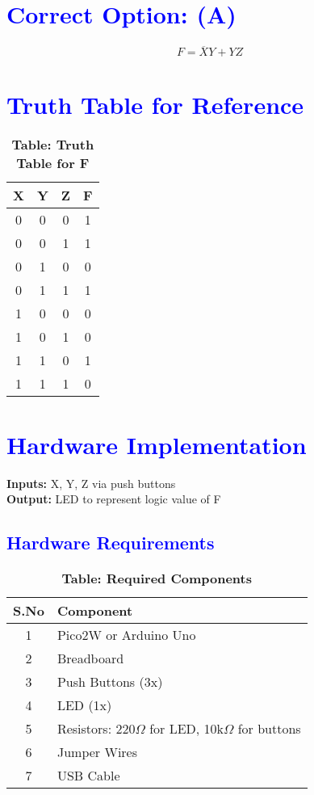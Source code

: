 \documentclass[twocolumn]{article}
\begin{document}
\section*{\textcolor{blue}{Correct Option: (A)}}
\[
F = \overline{X}Y + YZ
\]

\section*{\textcolor{blue}{Truth Table for Reference}}

\begin{table}[h]
\centering
\renewcommand{\arraystretch}{1.3}
\begin{tabular}{|c|c|c|c|}
\hline
\textbf{X} & \textbf{Y} & \textbf{Z} & \textbf{F} \\
\hline
0 & 0 & 0 & 1 \\
0 & 0 & 1 & 1 \\
0 & 1 & 0 & 0 \\
0 & 1 & 1 & 1 \\
1 & 0 & 0 & 0 \\
1 & 0 & 1 & 0 \\
1 & 1 & 0 & 1 \\
1 & 1 & 1 & 0 \\
\hline
\end{tabular}
\caption*{\textbf{Table: Truth Table for F}}
\end{table}

\section*{\textcolor{blue}{Hardware Implementation }}

\textbf{Inputs:} X, Y, Z via push buttons \\
\textbf{Output:} LED to represent logic value of F

\subsection*{\textcolor{blue}{Hardware Requirements}}

\begin{table}[h]
\centering
\renewcommand{\arraystretch}{1.3}
\begin{tabular}{|c|l|}
\hline
\textbf{S.No} & \textbf{Component} \\ \hline
1 & Pico2W or Arduino Uno \\
2 & Breadboard \\
3 & Push Buttons (3x) \\
4 & LED (1x) \\
5 & Resistors: 220$\Omega$ for LED, 10k$\Omega$ for buttons \\
6 & Jumper Wires \\
7 & USB Cable \\
\hline
\end{tabular}
\caption*{\textbf{Table: Required Components}}
\end{table}
\end{document}
